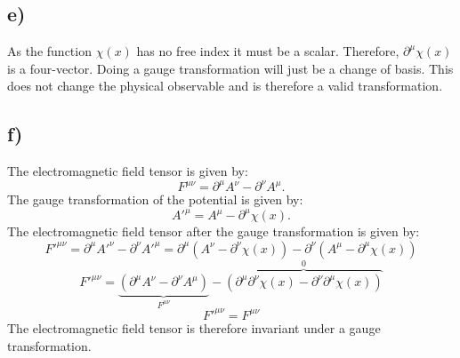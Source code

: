 \documentclass{article}
\begin{document}
\subsection*{e)}
As the function $χ(x)$ has no free index it must be a scalar. Therefore, $∂^{μ}χ(x)$ is a four-vector. Doing a gauge transformation will just be a change of basis. This does not change the physical observable and is therefore a valid transformation.

\subsection*{f)}
The electromagnetic field tensor is given by:
\[
F^{μν} = ∂^{μ}A^{ν} - ∂^{ν}A^{μ}.
\]
The gauge transformation of the potential is given by:
\[
A'^{μ} = A^{μ} - ∂^{μ}χ(x).
\]
The electromagnetic field tensor after the gauge transformation is given by:
\[
F'^{μν} = ∂^{μ}A'^{ν} - ∂^{ν}A'^{μ} = ∂^{μ}(A^{ν} - ∂^{ν}χ(x)) - ∂^{ν}(A^{μ} - ∂^{μ}χ(x))
\]
\[
F'^{μν} = \underbrace{\left(∂^{μ}A^{ν} - ∂^{ν}A^{μ}\right)}_{F^{μν}} - \overbrace{\left(∂^{μ}∂^{ν}χ(x) - ∂^{ν}∂^{μ}χ(x)\right)}^{0}
\]
\[
F'^{μν} = F^{μν}
\]
The electromagnetic field tensor is therefore invariant under a gauge transformation.
\end{document}
